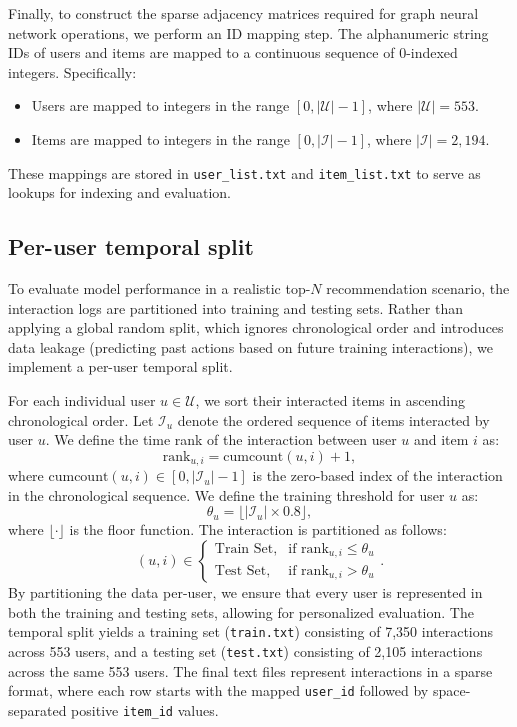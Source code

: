 Finally, to construct the sparse adjacency matrices required for graph neural network operations, we perform an ID mapping step. The alphanumeric string IDs of users and items are mapped to a continuous sequence of 0-indexed integers. Specifically:
\begin{itemize}
    \item Users are mapped to integers in the range $[0, |\mathcal{U}| - 1]$, where $|\mathcal{U}| = 553$.
    \item Items are mapped to integers in the range $[0, |\mathcal{I}| - 1]$, where $|\mathcal{I}| = 2,194$.
\end{itemize}
These mappings are stored in \texttt{user\_list.txt} and \texttt{item\_list.txt} to serve as lookups for indexing and evaluation.

\subsection{Per-user temporal split}

To evaluate model performance in a realistic top-$N$ recommendation scenario, the interaction logs are partitioned into training and testing sets. Rather than applying a global random split, which ignores chronological order and introduces data leakage (predicting past actions based on future training interactions), we implement a per-user temporal split.

For each individual user $u \in \mathcal{U}$, we sort their interacted items in ascending chronological order. Let $\mathcal{I}_u$ denote the ordered sequence of items interacted by user $u$. We define the time rank of the interaction between user $u$ and item $i$ as:
\begin{equation}
    \text{rank}_{u,i} = \text{cumcount}(u, i) + 1,
\end{equation}
where $\text{cumcount}(u, i) \in [0, |\mathcal{I}_u| - 1]$ is the zero-based index of the interaction in the chronological sequence. We define the training threshold for user $u$ as:
\begin{equation}
    \theta_u = \lfloor |\mathcal{I}_u| \times 0.8 \rfloor,
\end{equation}
where $\lfloor \cdot \rfloor$ is the floor function. The interaction is partitioned as follows:
\begin{equation}
    (u, i) \in \begin{cases}
        \text{Train Set}, & \text{if } \text{rank}_{u,i} \le \theta_u \\
        \text{Test Set}, & \text{if } \text{rank}_{u,i} > \theta_u
    \end{cases}.
\end{equation}
By partitioning the data per-user, we ensure that every user is represented in both the training and testing sets, allowing for personalized evaluation. The temporal split yields a training set (\texttt{train.txt}) consisting of 7,350 interactions across 553 users, and a testing set (\texttt{test.txt}) consisting of 2,105 interactions across the same 553 users. The final text files represent interactions in a sparse format, where each row starts with the mapped \texttt{user\_id} followed by space-separated positive \texttt{item\_id} values.
